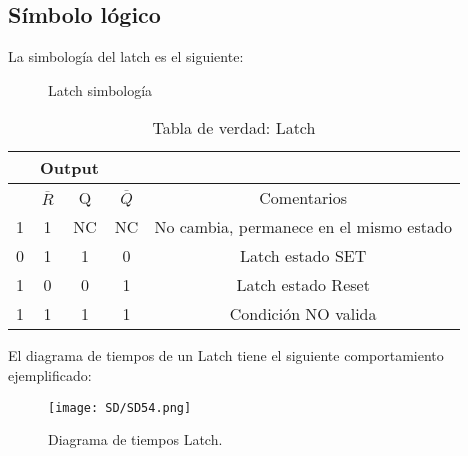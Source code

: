 \documentclass[
	12pt, %
	fleqn, %
	a4paper, %
]{LegrandOrangeBook}
\begin{document}
\subsection{Símbolo lógico}
La simbología del latch es el siguiente:
\begin{figure}
    \centering
    \qquad
    \caption{Latch simbología}
\end{figure}
\begin{table}[h]
\begin{center}
\begin{tabular}{|cc|cc|c|}
\hline
\rowcolor{ocre!70}
\multicolumn{2}{|c|}{Input}                           & \multicolumn{2}{c|}{Output}              &                                         \\ \hline
\rowcolor{ocre!50}
\multicolumn{1}{|c|}{$\overline{S}$} & $\overline{R}$ & \multicolumn{1}{c|}{Q}  & $\overline{Q}$ & Comentarios                             \\ \hline
\multicolumn{1}{|c|}{1}              & 1              & \multicolumn{1}{c|}{NC} & NC             & No cambia, permanece en el mismo estado \\ \hline
\multicolumn{1}{|c|}{0}              & 1              & \multicolumn{1}{c|}{1}  & 0              & Latch estado SET                        \\ \hline
\multicolumn{1}{|c|}{1}              & 0              & \multicolumn{1}{c|}{0}  & 1              & Latch estado Reset                      \\ \hline
\multicolumn{1}{|c|}{1}              & 1              & \multicolumn{1}{c|}{1}  & 1              & Condición NO valida                     \\ \hline
\end{tabular}
\caption{Tabla de verdad: Latch}
\end{center}
\end{table}
El diagrama de tiempos de un Latch tiene el siguiente comportamiento ejemplificado:
\begin{figure}[H]
\centering
\texttt{[image: SD/SD54.png]}
\caption{Diagrama de tiempos Latch.}
\end{figure}
\end{document}
